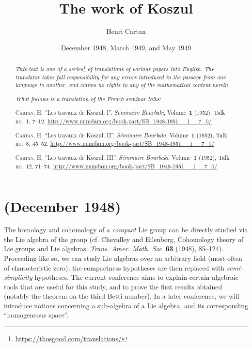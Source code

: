 \documentclass{article}
\title{The work of Koszul}
\author{Henri Cartan}
\date{December 1948, March 1949, and May 1949}
\newcommand{\oldpage}[1]{\marginpar{\footnotesize$\Big\vert$ \textit{p.~#1}}}
\begin{document}
\maketitle
\thispagestyle{fancy}

\renewcommand{\abstractname}{Translator's note.}

\begin{abstract}
  \renewcommand*{\thefootnote}{\fnsymbol{footnote}}
  \emph{This text is one of a series\footnote{\url{https://thosgood.com/translations/}} of translations of various papers into English.}
  \emph{The translator takes full responsibility for any errors introduced in the passage from one language to another, and claims no rights to any of the mathematical content herein.}
  
  \emph{What follows is a translation of the French seminar talks:}

  \medskip\noindent
  \textsc{Cartan, H.}
  ``Les travaux de Koszul, I''.
  \emph{S\'{e}minaire Bourbaki}, Volume~\textbf{1} (1952), Talk no.~1, 7--12.
  {\url{http://www.numdam.org/book-part/SB_1948-1951__1__7_0/}}

  \medskip\noindent
  \textsc{Cartan, H.}
  ``Les travaux de Koszul, II''.
  \emph{S\'{e}minaire Bourbaki}, Volume~\textbf{1} (1952), Talk no.~8, 45--52.
  {\url{http://www.numdam.org/book-part/SB_1948-1951__1__7_0/}}

  \medskip\noindent
  \textsc{Cartan, H.}
  ``Les travaux de Koszul, III''.
  \emph{S\'{e}minaire Bourbaki}, Volume~\textbf{1} (1952), Talk no.~12, 71--74.
  {\url{http://www.numdam.org/book-part/SB_1948-1951__1__7_0/}}
\end{abstract}

\setcounter{footnote}{0}

\tableofcontents
\bigskip



\part{(December 1948)}
\label{I}

\oldpage{7}
The homology and cohomology of a \emph{compact} Lie group can be directly studied via the Lie algebra of the group (cf. {\sc Chevalley and Eilenberg}, Cohomology theory of Lie groups and Lie algebras, \emph{Trans. Amer. Math. Soc}~\textbf{63} (1948), 85--124).
Proceeding like so, we can study Lie algebras over an arbitrary field (most often of characteristic zero);
the compactness hypotheses are then replaced with \emph{semi-simplicity} hypotheses.
The current conference aims to explain certain algebraic tools that are useful for this study, and to prove the first results obtained (notably the theorem on the third Betti number).
In a later conference, we will introduce notions concerning a sub-algebra of a Lie algebra, and its corresponding ``homogeneous space''.
\end{document}
